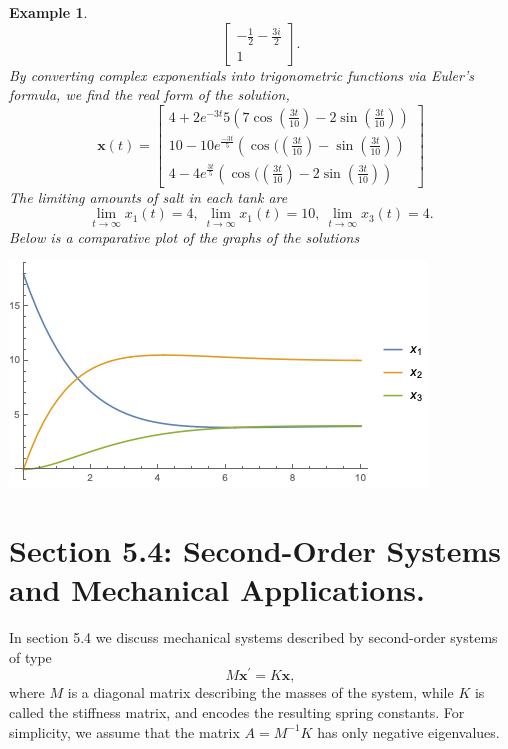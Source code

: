 \documentclass[11pt]{amsart}
\newtheorem{example}{Example}
\numberwithin{equation}{section}
\begin{document}
\begin{example}
\begin{equation*}
\begin{bmatrix}
-\frac{1}{2}-\frac{3i}{2}\\
1
\end{bmatrix}.
\end{equation*}
By converting complex exponentials into trigonometric functions via Euler's formula, we find the real form of the solution, 
\begin{equation*}
\mathbf{x}(t) = 
\begin{bmatrix}
4 + 2e^{-3t}{5}\left(7\cos\left(\frac{3t}{10}\right) -2\sin\left(\frac{3t}{10}\right)\right) \\
10 -10e^{\frac{-3t}{5}}\left(\cos(\left(\frac{3t}{10}\right)-\sin\left(\frac{3t}{10}\right) \right) \\
4 - 4e^{\frac{3t}{5}}\left(\cos(\left(\frac{3t}{10}\right) -2\sin\left(\frac{3t}{10}\right) \right)
\end{bmatrix}
\end{equation*}
The limiting amounts of salt in each tank are 
\begin{equation*}
\lim_{t \to \infty} x_1(t) = 4,\   \lim_{t \to \infty} x_1(t) = 10, \ \lim_{t \to \infty} x_3(t) = 4.
\end{equation*} 
Below is a comparative plot of the graphs of the solutions
\begin{center}
\includegraphics[width=0.8\linewidth]{p7.png} 
\end{center}
\end{example}

\section*{Section 5.4: Second-Order Systems and Mechanical Applications.}
In section 5.4 we discuss mechanical systems described by second-order systems of type 
\begin{equation*}
M\mathbf{x}^{'} = K\mathbf{x},
\end{equation*}
where $M$ is a diagonal matrix describing the masses of the system, while $K$ is called the stiffness matrix, and encodes the resulting spring constants. For simplicity, we assume that the matrix $A=M^{-1}K$ has only negative eigenvalues. 
\end{document}
